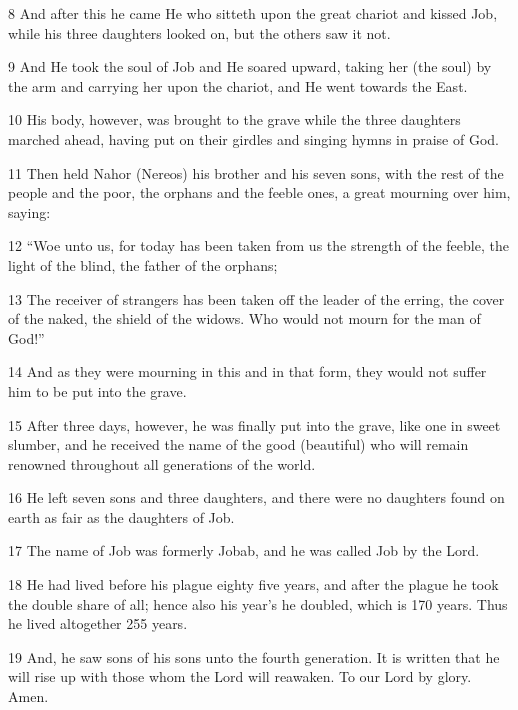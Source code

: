 \par 8 And after this he came He who sitteth upon the great chariot and kissed Job, while his three daughters looked on, but the others saw it not.

\par 9 And He took the soul of Job and He soared upward, taking her (the soul) by the arm and carrying her upon the chariot, and He went towards the East.

\par 10 His body, however, was brought to the grave while the three daughters marched ahead, having put on their girdles and singing hymns in praise of God.

\par 11 Then held Nahor (Nereos) his brother and his seven sons, with the rest of the people and the poor, the orphans and the feeble ones, a great mourning over him, saying:

\par 12 “Woe unto us, for today has been taken from us the strength of the feeble, the light of the blind, the father of the orphans;

\par 13 The receiver of strangers has been taken off the leader of the erring, the cover of the naked, the shield of the widows. Who would not mourn for the man of God!”

\par 14 And as they were mourning in this and in that form, they would not suffer him to be put into the grave.

\par 15 After three days, however, he was finally put into the grave, like one in sweet slumber, and he received the name of the good (beautiful) who will remain renowned throughout all generations of the world.

\par 16 He left seven sons and three daughters, and there were no daughters found on earth as fair as the daughters of Job.

\par 17 The name of Job was formerly Jobab, and he was called Job by the Lord.

\par 18 He had lived before his plague eighty five years, and after the plague he took the double share of all; hence also his year’s he doubled, which is 170 years. Thus he lived altogether 255 years.

\par 19 And, he saw sons of his sons unto the fourth generation. It is written that he will rise up with those whom the Lord will reawaken. To our Lord by glory. Amen.

